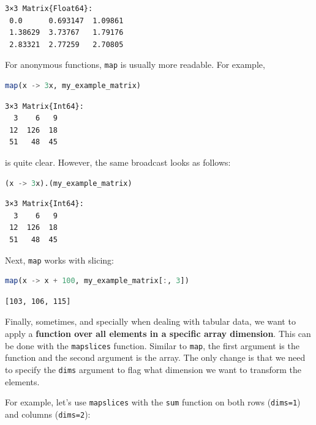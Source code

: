 \documentclass[
  notoc %
]{tufte-book}
\newcommand{\passthrough}[1]{#1}
\begin{document}
\begin{lstlisting}[language=Output]
3×3 Matrix{Float64}:
 0.0      0.693147  1.09861
 1.38629  3.73767   1.79176
 2.83321  2.77259   2.70805
\end{lstlisting}

For anonymous functions, \passthrough{\lstinline!map!} is usually more
readable. For example,

\begin{lstlisting}[language=Julia]
map(x -> 3x, my_example_matrix)
\end{lstlisting}

\begin{lstlisting}[language=Output]
3×3 Matrix{Int64}:
  3    6   9
 12  126  18
 51   48  45
\end{lstlisting}

is quite clear. However, the same broadcast looks as follows:

\begin{lstlisting}[language=Julia]
(x -> 3x).(my_example_matrix)
\end{lstlisting}

\begin{lstlisting}[language=Output]
3×3 Matrix{Int64}:
  3    6   9
 12  126  18
 51   48  45
\end{lstlisting}

Next, \passthrough{\lstinline!map!} works with slicing:

\begin{lstlisting}[language=Julia]
map(x -> x + 100, my_example_matrix[:, 3])
\end{lstlisting}

\begin{lstlisting}[language=Output]
[103, 106, 115]
\end{lstlisting}

Finally, sometimes, and specially when dealing with tabular data, we
want to apply a \textbf{function over all elements in a specific array
dimension}. This can be done with the
\passthrough{\lstinline!mapslices!} function. Similar to
\passthrough{\lstinline!map!}, the first argument is the function and
the second argument is the array. The only change is that we need to
specify the \passthrough{\lstinline!dims!} argument to flag what
dimension we want to transform the elements.

For example, let's use \passthrough{\lstinline!mapslices!} with the
\passthrough{\lstinline!sum!} function on both rows
(\passthrough{\lstinline!dims=1!}) and columns
(\passthrough{\lstinline!dims=2!}):
\end{document}
